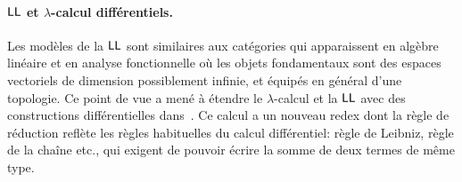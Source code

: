 \documentclass[a4]{article}
\begin{document}
\paragraph*{$\hbox{\textsf{LL}}$ et $\lambda$-calcul différentiels.}
Les modèles de la $\hbox{\textsf{LL}}$ sont similaires aux catégories qui
apparaissent en algèbre linéaire et en analyse fonctionnelle où les
objets fondamentaux sont des espaces vectoriels de dimension
possiblement infinie, et équipés en général d'une topologie.
%
Ce point de vue a mené à étendre le $\lambda$-calcul et la $\hbox{\textsf{LL}}$ avec
des constructions différentielles
dans~\cite{EhrhardRegnier02,EhrhardRegnier06d}.
%
%
Ce calcul a un nouveau redex
dont la règle de réduction reflète les règles habituelles du calcul
différentiel: règle de Leibniz, règle de la chaîne etc., qui exigent
de pouvoir écrire la somme de deux termes de même type.
%
\end{document}
